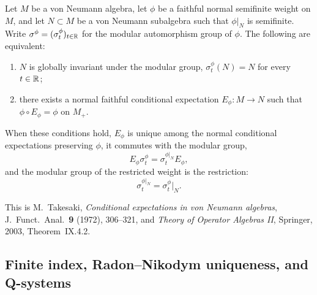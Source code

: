 \begin{theorem}
\label{thm:takesaki}
Let $M$ be a von Neumann algebra, let $\phi$ be a faithful normal
semifinite weight on $M$, and let $N\subset M$ be a von Neumann
subalgebra such that $\phi|_N$ is semifinite.  Write
$\sigma^\phi=(\sigma_t^\phi)_{t\in\mathbb R}$ for the modular automorphism
group of $\phi$.  The following are equivalent:
\begin{enumerate}[label=\textup{(\roman*)}]
\item $N$ is globally invariant under the modular group,
  $\sigma_t^\phi(N)=N$ for every $t\in\mathbb R$;
\item there exists a normal faithful conditional expectation
  $E_\phi:M\to N$ such that
  $\phi\circ E_\phi=\phi$ on $M_+$.
\end{enumerate}
When these conditions hold, $E_\phi$ is unique among the normal
conditional expectations preserving $\phi$, it commutes with the
modular group,
\[
 E_\phi\sigma_t^\phi=\sigma_t^{\phi|_N}E_\phi,
\tag{2.2}\label{eq:takesaki-intertwine}
\]
and the modular group of the restricted weight is the restriction:
\[
 \sigma_t^{\phi|_N}=\sigma_t^\phi|_N.
\tag{2.3}\label{eq:mod-restrict}
\]
\end{theorem}

This is M.~Takesaki, \emph{Conditional expectations in von Neumann
algebras}, J.\ Funct.\ Anal.\ \textbf{9} (1972), 306--321, and
\emph{Theory of Operator Algebras II}, Springer, 2003,
Theorem~IX.4.2.

\subsection{Finite index, Radon--Nikodym uniqueness, and Q-systems}

